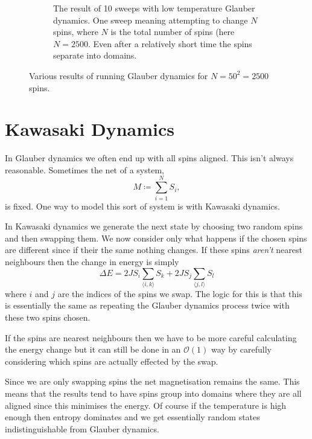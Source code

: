 \documentclass[fleqn]{NotesClass}
\newcommand*{\order}{\mathcal{O}}
\begin{document}
\begin{figure}
\begin{subfigure}[t]{0.45\textwidth}
            \caption[A few steps into Glauber dynamics.]{The result of 10 sweeps with low temperature Glauber dynamics. One sweep meaning attempting to change \(N\) spins, where \(N\) is the total number of spins (here \(N = 2500\). Even after a relatively short time the spins separate into domains.}
        \end{subfigure}
        \caption{Various results of running Glauber dynamics for \(N = 50^2 = 2500\) spins.}
    \end{figure}
    
    \section{Kawasaki Dynamics}
    In Glauber dynamics we often end up with all spins aligned.
    This isn't always reasonable.
    Sometimes the net  of a system,
    \begin{equation}
        M \coloneqq \sum_{i=1}^{N} S_i,
    \end{equation}
    is fixed.
    One way to model this sort of system is with Kawasaki dynamics.
    
    In Kawasaki dynamics we generate the next state by choosing two random spins and then swapping them.
    We now consider only what happens if the chosen spins are different since if their the same nothing changes.
    If these spins \emph{aren't} nearest neighbours then the change in energy is simply
    \begin{equation}
        \Delta E = 2JS_i \sum_{\langle i, k \rangle} S_k + 2JS_j \sum_{\langle j, l \rangle} S_l
    \end{equation}
    where \(i\) and \(j\) are the indices of the spins we swap.
    The logic for this is that this is essentially the same as repeating the Glauber dynamics process twice with these two spins chosen.
    
    If the spins are nearest neighbours then we have to be more careful calculating the energy change but it can still be done in an \(\order(1)\) way by carefully considering which spins are actually effected by the swap.
    
    Since we are only swapping spins the net magnetisation remains the same.
    This means that the results tend to have spins group into domains where they are all aligned since this minimises the energy.
    Of course if the temperature is high enough then entropy dominates and we get essentially random states indistinguishable from Glauber dynamics.
    
\end{document}
